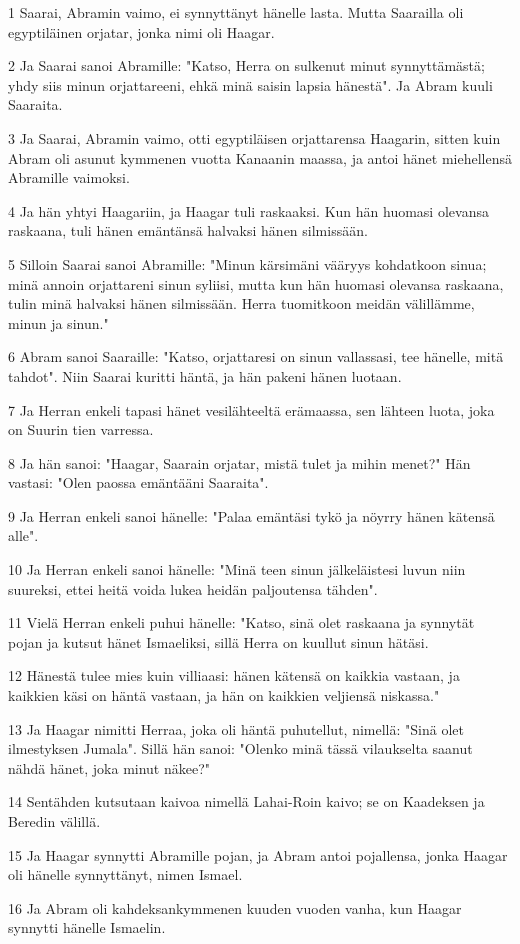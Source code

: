 \par 1 Saarai, Abramin vaimo, ei synnyttänyt hänelle lasta. Mutta Saarailla oli egyptiläinen orjatar, jonka nimi oli Haagar.
\par 2 Ja Saarai sanoi Abramille: "Katso, Herra on sulkenut minut synnyttämästä; yhdy siis minun orjattareeni, ehkä minä saisin lapsia hänestä". Ja Abram kuuli Saaraita.
\par 3 Ja Saarai, Abramin vaimo, otti egyptiläisen orjattarensa Haagarin, sitten kuin Abram oli asunut kymmenen vuotta Kanaanin maassa, ja antoi hänet miehellensä Abramille vaimoksi.
\par 4 Ja hän yhtyi Haagariin, ja Haagar tuli raskaaksi. Kun hän huomasi olevansa raskaana, tuli hänen emäntänsä halvaksi hänen silmissään.
\par 5 Silloin Saarai sanoi Abramille: "Minun kärsimäni vääryys kohdatkoon sinua; minä annoin orjattareni sinun syliisi, mutta kun hän huomasi olevansa raskaana, tulin minä halvaksi hänen silmissään. Herra tuomitkoon meidän välillämme, minun ja sinun."
\par 6 Abram sanoi Saaraille: "Katso, orjattaresi on sinun vallassasi, tee hänelle, mitä tahdot". Niin Saarai kuritti häntä, ja hän pakeni hänen luotaan.
\par 7 Ja Herran enkeli tapasi hänet vesilähteeltä erämaassa, sen lähteen luota, joka on Suurin tien varressa.
\par 8 Ja hän sanoi: "Haagar, Saarain orjatar, mistä tulet ja mihin menet?" Hän vastasi: "Olen paossa emäntääni Saaraita".
\par 9 Ja Herran enkeli sanoi hänelle: "Palaa emäntäsi tykö ja nöyrry hänen kätensä alle".
\par 10 Ja Herran enkeli sanoi hänelle: "Minä teen sinun jälkeläistesi luvun niin suureksi, ettei heitä voida lukea heidän paljoutensa tähden".
\par 11 Vielä Herran enkeli puhui hänelle: "Katso, sinä olet raskaana ja synnytät pojan ja kutsut hänet Ismaeliksi, sillä Herra on kuullut sinun hätäsi.
\par 12 Hänestä tulee mies kuin villiaasi: hänen kätensä on kaikkia vastaan, ja kaikkien käsi on häntä vastaan, ja hän on kaikkien veljiensä niskassa."
\par 13 Ja Haagar nimitti Herraa, joka oli häntä puhutellut, nimellä: "Sinä olet ilmestyksen Jumala". Sillä hän sanoi: "Olenko minä tässä vilaukselta saanut nähdä hänet, joka minut näkee?"
\par 14 Sentähden kutsutaan kaivoa nimellä Lahai-Roin kaivo; se on Kaadeksen ja Beredin välillä.
\par 15 Ja Haagar synnytti Abramille pojan, ja Abram antoi pojallensa, jonka Haagar oli hänelle synnyttänyt, nimen Ismael.
\par 16 Ja Abram oli kahdeksankymmenen kuuden vuoden vanha, kun Haagar synnytti hänelle Ismaelin.

